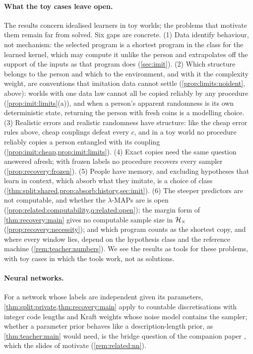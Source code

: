 \paragraph{What the toy cases leave open.} The results concern idealised learners in toy worlds; the problems that motivate them remain far from solved. Six gaps are concrete. (1) Data identify behaviour, not mechanism: the selected program is a shortest program in the class for the learned kernel, which may compute it unlike the person and extrapolates off the support of the inputs as that program does (\cref{sec:imit}). (2) Which structure belongs to the person and which to the environment, and with it the complexity weight, are conventions that imitation data cannot settle (\cref{prop:limits:noident}, above): worlds with one data law cannot all be copied reliably by any procedure (\cref{prop:imit:limits}(a)), and when a person's apparent randomness is its own deterministic state, returning the person with fresh coins is a modelling choice. (3) Realistic errors and realistic randomness have structure: like the cheap error rules above, cheap couplings defeat every $c$, and in a toy world no procedure reliably copies a person entangled with its coupling (\cref{prop:imit:cheap,prop:imit:limits}). (4) Exact copies need the same question answered afresh; with frozen labels no procedure recovers every sampler (\cref{prop:recovery:frozen}). (5) People have memory, and excluding hypotheses that learn in context, which absorb what they imitate, is a choice of class (\cref{thm:split:shared,prop:absorb:history,sec:imit}). (6) The steeper predictors are not computable, and whether the $\lambda$-MAPs are is open (\cref{prop:related:computability,q:related:open}); the margin form of \cref{thm:recovery:main} gives no computable sample size in $\mathcal{H}_{\times}$ (\cref{prop:recovery:necessity}); and which program counts as the shortest copy, and where every window lies, depend on the hypothesis class and the reference machine (\cref{rem:teacher:numbers}). We see the results as tools for these problems, with toy cases in which the tools work, not as solutions.

\paragraph{Neural networks.} For a network whose labels are independent given its parameters, \cref{thm:split:private,thm:recovery:main} apply to countable discretisations with integer code lengths and Kraft weights whose noise model contains the sampler; whether a parameter prior behaves like a description-length prior, as \cref{thm:teacher:main} would need, is the bridge question of the companion paper \citep[Question~10.9]{claudeSFI2026fundamentals}, which the slides of \citet{vaintrobhanni2026nnbayes} motivate (\cref{rem:related:nn}).%

